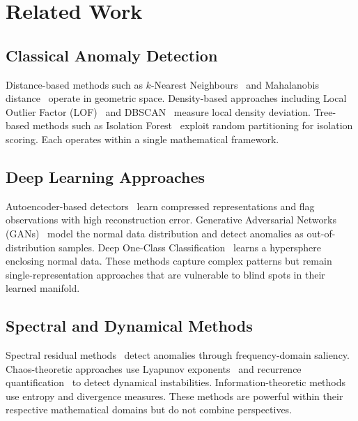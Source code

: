 \documentclass[journal]{IEEEtran}
\begin{document}
\section{Related Work}
\label{sec:related}

\subsection{Classical Anomaly Detection}

Distance-based methods such as $k$-Nearest Neighbours~\cite{ramaswamy2000efficient} and Mahalanobis distance~\cite{de2000mahalanobis} operate in geometric space. Density-based approaches including Local Outlier Factor (LOF)~\cite{breunig2000lof} and DBSCAN~\cite{ester1996density} measure local density deviation. Tree-based methods such as Isolation Forest~\cite{liu2008isolation} exploit random partitioning for isolation scoring. Each operates within a single mathematical framework.

\subsection{Deep Learning Approaches}

Autoencoder-based detectors~\cite{an2015variational,zhou2017anomaly} learn compressed representations and flag observations with high reconstruction error. Generative Adversarial Networks (GANs)~\cite{schlegl2017unsupervised} model the normal data distribution and detect anomalies as out-of-distribution samples. Deep One-Class Classification~\cite{ruff2018deep} learns a hypersphere enclosing normal data. These methods capture complex patterns but remain single-representation approaches that are vulnerable to blind spots in their learned manifold.

\subsection{Spectral and Dynamical Methods}

Spectral residual methods~\cite{ren2019time} detect anomalies through frequency-domain saliency. Chaos-theoretic approaches use Lyapunov exponents~\cite{rosenstein1993practical} and recurrence quantification~\cite{marwan2007recurrence} to detect dynamical instabilities. Information-theoretic methods~\cite{lee2001information} use entropy and divergence measures. These methods are powerful within their respective mathematical domains but do not combine perspectives.
\end{document}

